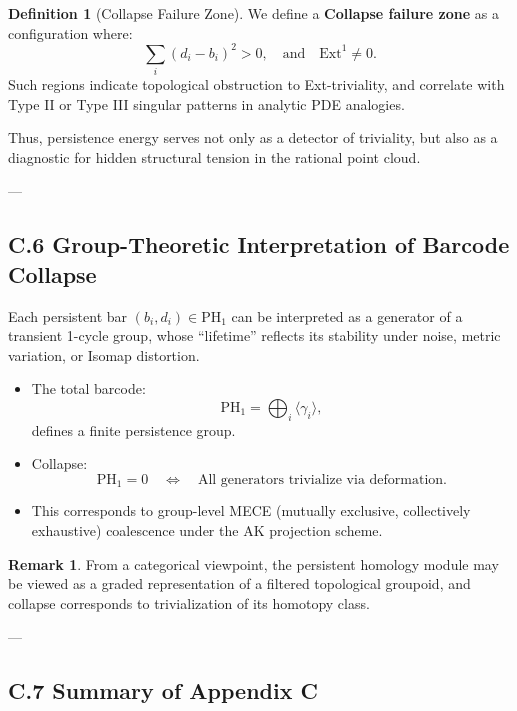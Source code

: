 \documentclass[11pt]{article}
\theoremstyle{definition}
\newtheorem{definition}[theorem]{Definition}
\newtheorem{remark}[theorem]{Remark}
\begin{document}
\begin{definition}[Collapse Failure Zone]
We define a \textbf{Collapse failure zone} as a configuration where:
\[
\sum_i (d_i - b_i)^2 > 0,
\quad \text{and} \quad \mathrm{Ext}^1 \neq 0.
\]
Such regions indicate topological obstruction to Ext-triviality, and correlate with  
Type II or Type III singular patterns in analytic PDE analogies.
\end{definition}

Thus, persistence energy serves not only as a detector of triviality,  
but also as a diagnostic for hidden structural tension in the rational point cloud.

---

\subsection*{C.6 Group-Theoretic Interpretation of Barcode Collapse}

Each persistent bar \( (b_i, d_i) \in \mathrm{PH}_1 \) can be interpreted  
as a generator of a transient 1-cycle group, whose “lifetime” reflects its stability  
under noise, metric variation, or Isomap distortion.

\begin{itemize}
  \item The total barcode:
  \[
  \mathrm{PH}_1 = \bigoplus_i \langle \gamma_i \rangle,
  \]
  defines a finite persistence group.

  \item Collapse:
  \[
  \mathrm{PH}_1 = 0 \quad \Leftrightarrow \quad \text{All generators trivialize via deformation}.
  \]

  \item This corresponds to group-level MECE (mutually exclusive, collectively exhaustive) coalescence  
  under the AK projection scheme.
\end{itemize}

\begin{remark}
From a categorical viewpoint, the persistent homology module may be viewed  
as a graded representation of a filtered topological groupoid,  
and collapse corresponds to trivialization of its homotopy class.
\end{remark}

---

\subsection*{C.7 Summary of Appendix C}
\end{document}
